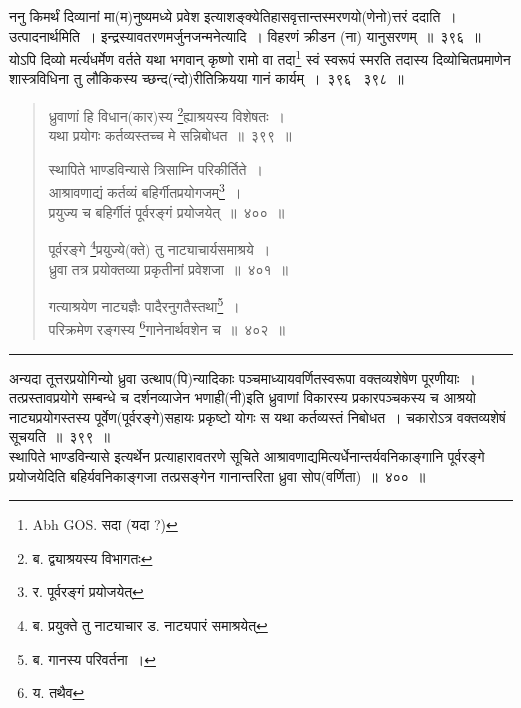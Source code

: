 \documentclass[11pt, openany]{book}
\begin{document}
ननु किमर्थं दिव्यानां मा(म)नुष्यमध्ये प्रवेश इत्याशङ्क्येतिहासवृत्तान्तस्मरणयो(णेनो)त्तरं ददाति~। उत्पादनार्थमिति~। इन्द्रस्यावतरणमर्जुनजन्मनेत्यादि~। विहरणं क्रीडन (ना) यानुसरणम्~॥~३९६~॥\\

योऽपि दिव्यो मर्त्यधर्मेण वर्तते यथा भगवान् कृष्णो रामो वा तदा\renewcommand{\thefootnote}{*}\footnote{Abh GOS. सदा (यदा ?)} स्वं स्वरूपं स्मरति तदास्य दिव्योचितप्रमाणेन शास्त्रविधिना तु लौकिकस्य च्छन्द(न्दो)रीतिक्रियया गानं कार्यम्~।~३९६ \textendash\ ३९८~॥

\newpage

\begin{quote}
{\na ध्रुवाणां हि विधान(कार)स्य \renewcommand{\thefootnote}{1}\footnote{ब. द्व्याश्रयस्य विभागतः}ह्याश्रयस्य विशेषतः~।\\
 यथा प्रयोगः कर्तव्यस्तच्च मे सन्निबोधत~॥~३९९~॥

 स्थापिते भाण्डविन्यासे त्रिसाम्नि परिकीर्तिते~।\\
 आश्रावणाद्यं कर्तव्यं बहिर्गीतप्रयोगजम्\renewcommand{\thefootnote}{2}\footnote{र. पूर्वरङ्गं प्रयोजयेत्}~।\\
 प्रयुज्य च बहिर्गीतं पूर्वरङ्गं प्रयोजयेत्~॥~४००~॥

 पूर्वरङ्गे \renewcommand{\thefootnote}{3}\footnote{ब. प्रयुक्ते तु नाट्याचार ड. नाट्यपारं समाश्रयेत्}प्रयुज्ये(क्ते) तु नाट्याचार्यसमाश्रये~।\\
 ध्रुवा तत्र प्रयोक्तव्या प्रकृतीनां प्रवेशजा~॥~४०१~॥

 गत्याश्रयेण नाट्यज्ञैः पादैरनुगतैस्तथा\renewcommand{\thefootnote}{4}\footnote{ब. गानस्य परिवर्तना~।}~।\\
 परिक्रमेण रङ्गस्य \renewcommand{\thefootnote}{5}\footnote{य. तथैव}गानेनार्थवशेन च~॥~४०२~॥}
\end{quote}

\hrule

\vspace{2mm}
अन्यदा तूत्तरप्रयोगिन्यो ध्रुवा उत्थाप(पि)न्यादिकाः {\qtt पञ्चमाध्याय}वर्णितस्वरूपा वक्तव्यशेषेण पूरणीयाः~। तत्प्रस्तावप्रयोगे सम्बन्धे च दर्शनव्याजेन भणाही(नी)इति {\qtt ध्रुवाणां विकारस्य} प्रकारपञ्चकस्य च आश्रयो नाट्यप्रयोगस्तस्य पूर्वेण(पूर्वरङ्गे)सहायः प्रकृष्टो योगः स यथा कर्तव्यस्तं निबोधत~। चकारोऽत्र वक्तव्यशेषं सूचयति~॥~३९९~॥\\

{\qtt स्थापिते भाण्डविन्यासे} इत्यर्थेन प्रत्याहारावतरणे सूचिते आश्रावणाद्यमित्यर्धेनान्तर्यवनिकाङ्गानि पूर्वरङ्गे प्रयोजयेदिति बहिर्यवनिकाङ्गजा तत्प्रसङ्गेन गानान्तरिता ध्रुवा सोप(वर्णिता)~॥~४००~॥\\
\end{document}
